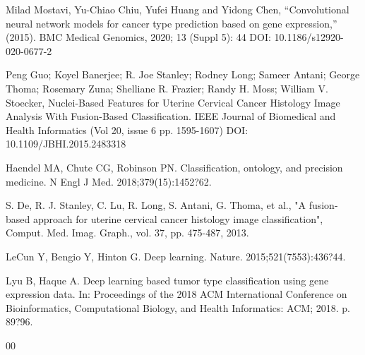 \documentclass[conference]{IEEEtran}
\begin{document}
\begin{thebibliography}{00}

 Milad Mostavi, Yu-Chiao Chiu, Yufei Huang and Yidong Chen, ``Convolutional neural network models for cancer type prediction based on gene expression,'' (2015).  BMC Medical Genomics, 2020; 13 (Suppl 5): 44 DOI: 10.1186/s12920-020-0677-2

 Peng Guo; Koyel Banerjee; R. Joe Stanley; Rodney Long; Sameer Antani; George Thoma; Rosemary Zuna; Shelliane R. Frazier; Randy H. Moss; William V. Stoecker, Nuclei-Based Features for Uterine Cervical Cancer Histology Image Analysis With Fusion-Based Classification. IEEE Journal of Biomedical and Health Informatics (Vol 20, issue 6 pp. 1595-1607) DOI: 10.1109/JBHI.2015.2483318

 Haendel MA, Chute CG, Robinson PN. Classification, ontology, and precision medicine. N Engl J Med. 2018;379(15):1452?62.

 S. De, R. J. Stanley, C. Lu, R. Long, S. Antani, G. Thoma, et al., "A fusion-based approach for uterine cervical cancer histology image classification", Comput. Med. Imag. Graph., vol. 37, pp. 475-487, 2013.

 LeCun Y, Bengio Y, Hinton G. Deep learning. Nature. 2015;521(7553):436?44.

 Lyu B, Haque A. Deep learning based tumor type classification using gene expression data. In: Proceedings of the 2018 ACM International Conference on Bioinformatics, Computational Biology, and Health Informatics: ACM; 2018. p. 89?96.

\end{thebibliography}{00}
\vspace{12pt}
\end{document}
